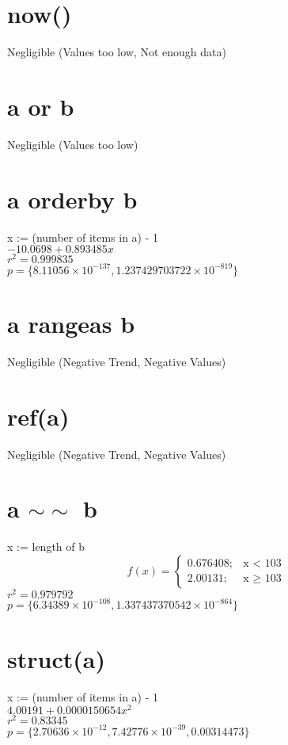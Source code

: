 \documentclass[12pt]{article}
\begin{document}
	\section{now()}
	Negligible (Values too low, Not enough data)
	
	\section{a or b}
	Negligible (Values too low)
	
	\section{a orderby b} %
	x := (number of items in a) - 1\\
	$-10.0698 + 0.893485 x$\\
	$r^2 = 0.999835$\\
	$p = \{8.11056 \times 10^{-137}, 1.237429703722 \times 10^{-819}\}$
	
	\section{a rangeas b}
	Negligible (Negative Trend, Negative Values)
	
	\section{ref(a)}
	Negligible (Negative Trend, Negative Values)
	
	\section{a $\sim\sim$ b}
	x := length of b
	\begin{displaymath}
		f(x) = \left\{
			\begin{array}{lr}
				0.676408; & \text{x $<$ 103}\\
				2.00131; & \text{x $\geq$ 103}
			\end{array}
		\right.
	\end{displaymath}
	$r^2 = 0.979792$\\
	$p = \{6.34389 \times 10^{-108}, 1.337437370542 \times 10^{-864}\}$
	
	\section{struct(a)}
	x := (number of items in a) - 1\\
	$4.00191 + 0.0000150654 x^2$\\
	$r^2 = 0.83345$\\
	$p = \{2.70636 \times 10^{-12}, 7.42776 \times 10^{-39}, 0.00314473\}$
	
\end{document}
